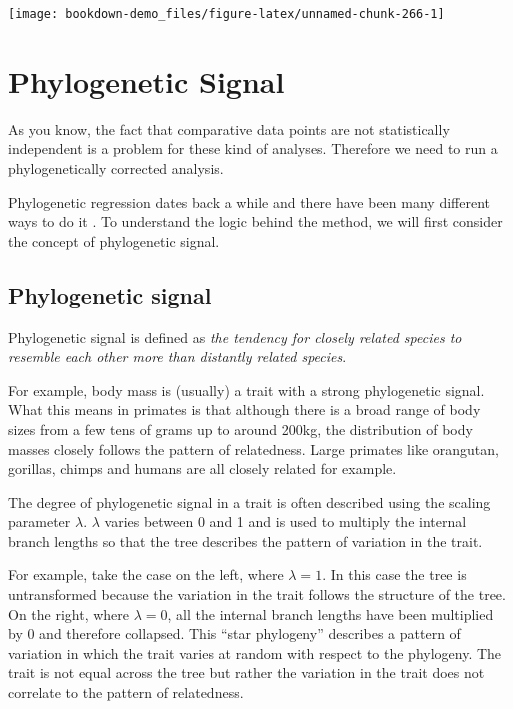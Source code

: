 \documentclass[
]{book}
\begin{document}
\begin{center}\texttt{[image: bookdown-demo\_files/figure-latex/unnamed-chunk-266-1]} \end{center}

\hypertarget{phylogenetic-signal}{%
\section{Phylogenetic Signal}\label{phylogenetic-signal}}

As you know, the fact that comparative data points are not statistically independent is a problem for these kind of analyses. Therefore we need to run a phylogenetically corrected analysis.

Phylogenetic regression dates back a while and there have been many different ways to do it \citep{Grafen89, Nunn11}. To understand the logic behind the method, we will first consider the concept of phylogenetic signal.

\hypertarget{phylogenetic-signal-1}{%
\subsection{Phylogenetic signal}\label{phylogenetic-signal-1}}

Phylogenetic signal is defined as \emph{the tendency for closely related species to resemble each other more than distantly related species}.

For example, body mass is (usually) a trait with a strong phylogenetic signal. What this means in primates is that although there is a broad range of body sizes from a few tens of grams up to around 200kg, the distribution of body masses closely follows the pattern of relatedness. Large primates like orangutan, gorillas, chimps and humans are all closely related for example.

The degree of phylogenetic signal in a trait is often described using the scaling parameter \(\lambda\). \(\lambda\) varies between 0 and 1 and is used to multiply the internal branch lengths so that the tree describes the pattern of variation in the trait.

For example, take the case on the left, where \(\lambda = 1\). In this case the tree is untransformed because the variation in the trait follows the structure of the tree. On the right, where \(\lambda = 0\), all the internal branch lengths have been multiplied by 0 and therefore collapsed. This ``star phylogeny'' describes a pattern of variation in which the trait varies at random with respect to the phylogeny. The trait is not equal across the tree but rather the variation in the trait does not correlate to the pattern of relatedness.
\end{document}
